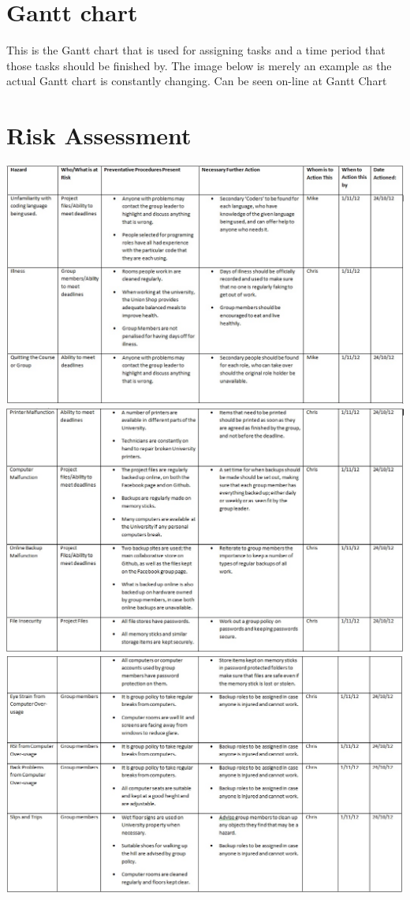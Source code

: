 \documentclass{project}
\begin{document}
\section{Gantt chart}
This is the Gantt chart that is used for assigning tasks and a time period that those
tasks should be finished by. The image below is merely an example as the actual
Gantt chart is constantly changing. Can be seen on-line at
Gantt Chart

\section{Risk Assessment}
\includegraphics[scale=0.6]{risk1.jpg}\\
\includegraphics[scale=0.6]{risk2.jpg}\\
\includegraphics[scale=0.6]{risk3.jpg}\\
\end{document}
